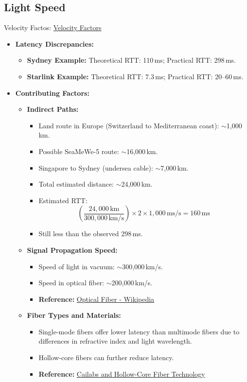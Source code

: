 \documentclass[../Main.tex]{subfiles}
\begin{document}
\subsection{Light Speed}
Velocity Factos: \href{https://en.wikipedia.org/wiki/Velocity_factor}{Velocity Factors}
\begin{itemize}
    \item \textbf{Latency Discrepancies:}
    \begin{itemize}
        \item \textbf{Sydney Example:} Theoretical RTT: 110\,ms; Practical RTT: 298\,ms.
        \item \textbf{Starlink Example:} Theoretical RTT: 7.3\,ms; Practical RTT: 20--60\,ms.
    \end{itemize}
    \item \textbf{Contributing Factors:}
    \begin{itemize}
        \item \textbf{Indirect Paths:}
        \begin{itemize}
            \item Land route in Europe (Switzerland to Mediterranean coast): $\sim$1,000\,km.
            \item Possible SeaMeWe-5 route: $\sim$16,000\,km.
            \item Singapore to Sydney (undersea cable): $\sim$7,000\,km.
            \item Total estimated distance: $\sim$24,000\,km.
            \item Estimated RTT: 
            \[
            \left(\frac{24,000\,\text{km}}{300,000\,\text{km/s}}\right) \times 2 \times 1,000\,\text{ms/s} = 160\,\text{ms}
            \]
            \item Still less than the observed 298\,ms.
        \end{itemize}
        \item \textbf{Signal Propagation Speed:}
        \begin{itemize}
            \item Speed of light in vacuum: $\sim$300,000\,km/s.
            \item Speed in optical fiber: $\sim$200,000\,km/s.
            \item \textbf{Reference:} \href{https://en.wikipedia.org/wiki/Optical_fiber}{Optical Fiber - Wikipedia}
        \end{itemize}
        \item \textbf{Fiber Types and Materials:}
        \begin{itemize}
            \item Single-mode fibers offer lower latency than multimode fibers due to differences in refractive index and light wavelength.
            \item Hollow-core fibers can further reduce latency.
            \item \textbf{Reference:} \href{https://www.ft.com/content/4307c389-f8b1-42f4-9623-256264b2c611}{Cailabs and Hollow-Core Fiber Technology}
        \end{itemize}
    \end{itemize}
\end{itemize}
\end{document}
